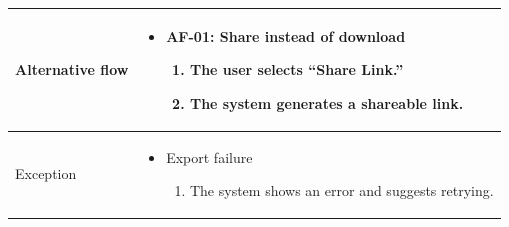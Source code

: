 \begin{table}[H]
    \begin{tabular}{|>{\raggedright\arraybackslash}p{}|>{\raggedright\arraybackslash}p{}|}
        \hline
        Alternative flow &
        \begin{itemize}
            \item AF-01: Share instead of download
            \begin{enumerate}
                \item The user selects “Share Link.”
                \item The system generates a shareable link.
            \end{enumerate}
        \end{itemize} \\
        \hline
        Exception &
        \begin{itemize}
            \item Export failure
            \begin{enumerate}
                \item The system shows an error and suggests retrying.
            \end{enumerate}
        \end{itemize}\\
        \hline
    \end{tabular}
\end{table}